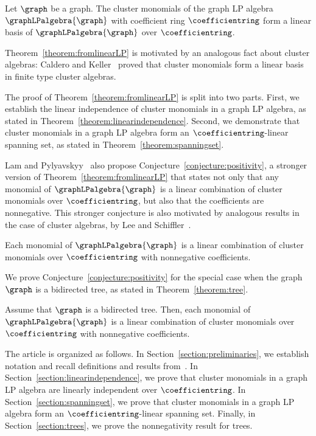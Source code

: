\begin{theo}\label{theorem:fromlinearLP}
    Let \(\graph\) be a graph.
    The cluster monomials of the graph LP algebra \(\graphLPalgebra{\graph}\) with coefficient ring \(\coefficientring\) form a linear basis of \(\graphLPalgebra{\graph}\) over \(\coefficientring\).
\end{theo}

Theorem~\ref{theorem:fromlinearLP} is motivated by an analogous fact about cluster algebras: Caldero and Keller~\cite{basis} proved that cluster monomials form a linear basis in finite type cluster algebras.

The proof of Theorem~\ref{theorem:fromlinearLP} is split into two parts.
First, we establish the linear independence of cluster monomials in a graph LP algebra, as stated in Theorem~\ref{theorem:linearindependence}.
Second, we demonstrate that cluster monomials in a graph LP algebra form an \(\coefficientring\)-linear spanning set, as stated in Theorem~\ref{theorem:spanningset}. 

Lam and Pylyavskyy~\cite{linearLP} also propose Conjecture~\ref{conjecture:positivity},
a stronger version of Theorem~\ref{theorem:fromlinearLP} that states not only that any monomial of \(\graphLPalgebra{\graph}\) is a linear combination of cluster monomials over \(\coefficientring\),
but also that the coefficients are nonnegative.
This stronger conjecture is also motivated by analogous results in the case of cluster algebras, by Lee and Schiffler~\cite{cluster-positivity-LS}.

\begin{conj} \label{conjecture:positivity}
    Each monomial of \(\graphLPalgebra{\graph}\) is a linear combination of cluster monomials over \(\coefficientring\) with nonnegative coefficients.
\end{conj}

We prove Conjecture~\ref{conjecture:positivity} for the special case when the graph \(\graph\) is a bidirected tree, as stated in Theorem~\ref{theorem:tree}.

\begin{theo} \label{theorem:tree}
    Assume that \(\graph\) is a bidirected tree. Then, each monomial of \(\graphLPalgebra{\graph}\) is a linear combination of cluster monomials over \(\coefficientring\) with nonnegative coefficients.
\end{theo}

The article is organized as follows.
In Section~\ref{section:preliminaries}, we establish notation and recall definitions and results from~\cite{linearLP}.
In Section~\ref{section:linearindependence}, we prove that cluster monomials in a graph LP algebra are linearly independent over \(\coefficientring\).
In Section~\ref{section:spanningset}, we prove that cluster monomials in a graph LP algebra form an \(\coefficientring\)-linear spanning set. Finally, in Section~\ref{section:trees}, we prove the nonnegativity result for trees. 

